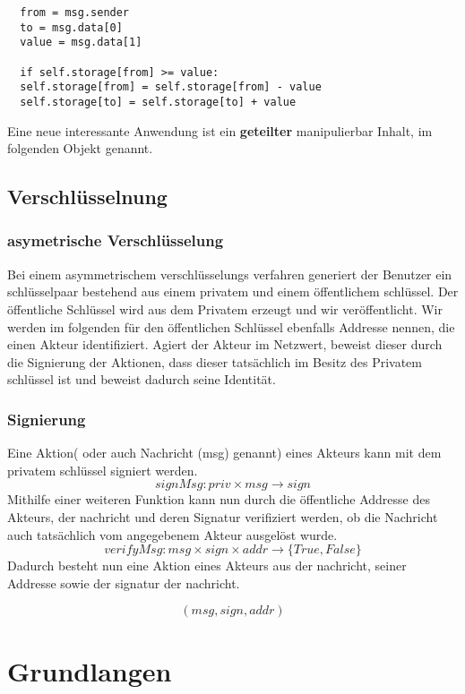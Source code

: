 \documentclass[]{article}
\begin{document}
\begin{lstlisting}
  from = msg.sender
  to = msg.data[0]
  value = msg.data[1]

  if self.storage[from] >= value:
  self.storage[from] = self.storage[from] - value
  self.storage[to] = self.storage[to] + value
\end{lstlisting}


Eine neue interessante Anwendung ist ein \textbf{geteilter} manipulierbar Inhalt, im folgenden Objekt genannt. 


\subsection*{ Verschlüsselnung }

\subsubsection*{asymetrische Verschlüsselung}
Bei einem asymmetrischem verschlüsselungs verfahren generiert der Benutzer ein schlüsselpaar bestehend aus einem privatem und einem öffentlichem schlüssel. Der öffentliche Schlüssel wird aus dem Privatem erzeugt und wir veröffentlicht. Wir werden im folgenden für den öffentlichen Schlüssel ebenfalls Addresse nennen, die einen Akteur identifiziert. Agiert der Akteur im Netzwert, beweist dieser durch die Signierung der Aktionen, dass dieser tatsächlich im Besitz des Privatem schlüssel ist und beweist dadurch seine Identität.

\subsubsection*{Signierung}

Eine Aktion( oder auch Nachricht (msg) genannt) eines Akteurs kann mit dem privatem schlüssel signiert werden.
\[ signMsg: priv \times msg \rightarrow sign \] 
Mithilfe einer weiteren Funktion kann nun durch die öffentliche Addresse des Akteurs, der nachricht und deren Signatur verifiziert werden, ob die Nachricht auch tatsächlich vom angegebenem Akteur ausgelöst wurde.
\[ verifyMsg: msg \times sign \times addr \rightarrow \{ True, False \} \] 
Dadurch besteht nun eine Aktion eines Akteurs aus der nachricht, seiner Addresse sowie der signatur der nachricht.

\[ (msg, sign, addr) \] 


\section{Grundlangen}
\end{document}
